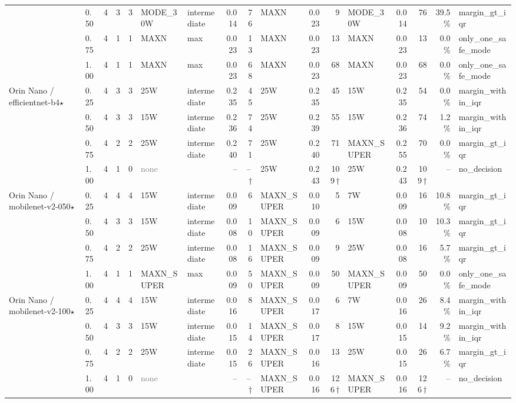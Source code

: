\documentclass[10pt]{article}
\begin{document}
\begin{center}
\begin{longtable}{@{}l l r r r l l r r l r r l r r r l@{}}
 & 0.50 & 4 & 3 & 3 & MODE\_30W & intermediate & 0.014 & 76 & MAXN & 0.023 & 9 & MODE\_30W & 0.014 & 76 & 39.5\% & margin\_gt\_iqr \\
 & 0.75 & 4 & 1 & 1 & MAXN & max & 0.023 & 13 & MAXN & 0.023 & 13 & MAXN & 0.023 & 13 & 0.0\% & only\_one\_safe\_mode \\
 & 1.00 & 4 & 1 & 1 & MAXN & max & 0.023 & 68 & MAXN & 0.023 & 68 & MAXN & 0.023 & 68 & 0.0\% & only\_one\_safe\_mode \\
\addlinespace[2pt]
Orin Nano / efficientnet-b4$\star$ & 0.25 & 4 & 3 & 3 & 25W & intermediate & 0.235 & 45 & 25W & 0.235 & 45 & 15W & 0.235 & 54 & 0.0\% & margin\_within\_iqr \\
 & 0.50 & 4 & 3 & 3 & 15W & intermediate & 0.236 & 74 & 25W & 0.239 & 55 & 15W & 0.236 & 74 & 1.2\% & margin\_within\_iqr \\
 & 0.75 & 4 & 2 & 2 & 25W & intermediate & 0.240 & 71 & 25W & 0.240 & 71 & MAXN\_SUPER & 0.255 & 70 & 0.0\% & margin\_gt\_iqr \\
 & 1.00 & 4 & 1 & 0 & \textcolor{gray}{none} &  & -- & --\,$\dagger$ & 25W & 0.243 & 109\,$\dagger$ & 25W & 0.243 & 109\,$\dagger$ & -- & no\_decision \\
\addlinespace[2pt]
Orin Nano / mobilenet-v2-050$\star$ & 0.25 & 4 & 4 & 4 & 15W & intermediate & 0.009 & 6 & MAXN\_SUPER & 0.010 & 5 & 7W & 0.009 & 16 & 10.8\% & margin\_gt\_iqr \\
 & 0.50 & 4 & 3 & 3 & 15W & intermediate & 0.008 & 10 & MAXN\_SUPER & 0.009 & 6 & 15W & 0.008 & 10 & 10.3\% & margin\_gt\_iqr \\
 & 0.75 & 4 & 2 & 2 & 25W & intermediate & 0.008 & 16 & MAXN\_SUPER & 0.009 & 9 & 25W & 0.008 & 16 & 5.7\% & margin\_gt\_iqr \\
 & 1.00 & 4 & 1 & 1 & MAXN\_SUPER & max & 0.009 & 50 & MAXN\_SUPER & 0.009 & 50 & MAXN\_SUPER & 0.009 & 50 & 0.0\% & only\_one\_safe\_mode \\
\addlinespace[2pt]
Orin Nano / mobilenet-v2-100$\star$ & 0.25 & 4 & 4 & 4 & 15W & intermediate & 0.016 & 8 & MAXN\_SUPER & 0.017 & 6 & 7W & 0.016 & 26 & 8.4\% & margin\_within\_iqr \\
 & 0.50 & 4 & 3 & 3 & 15W & intermediate & 0.015 & 14 & MAXN\_SUPER & 0.017 & 8 & 15W & 0.015 & 14 & 9.2\% & margin\_within\_iqr \\
 & 0.75 & 4 & 2 & 2 & 25W & intermediate & 0.015 & 26 & MAXN\_SUPER & 0.016 & 13 & 25W & 0.015 & 26 & 6.7\% & margin\_gt\_iqr \\
 & 1.00 & 4 & 1 & 0 & \textcolor{gray}{none} &  & -- & --\,$\dagger$ & MAXN\_SUPER & 0.016 & 126\,$\dagger$ & MAXN\_SUPER & 0.016 & 126\,$\dagger$ & -- & no\_decision \\

\end{longtable}
\end{center}
\end{document}
